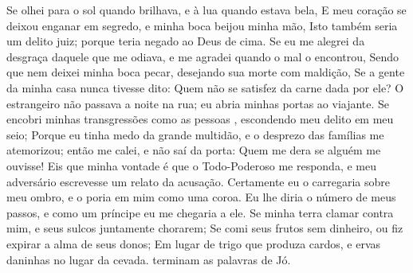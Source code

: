 {Se olhei para o sol quando brilhava, e à lua quando estava bela,
E meu coração se deixou enganar em segredo, e minha boca beijou minha mão,
Isto também seria um delito
{} juiz; porque teria negado ao Deus de cima.
Se eu me alegrei da desgraça daquele que me odiava, e me agradei quando o mal o encontrou,
Sendo que nem deixei minha boca pecar, desejando sua morte com maldição,
Se a gente da minha casa nunca tivesse dito: Quem não se satisfez da carne dada por ele?
O estrangeiro não passava a noite na rua; eu abria minhas portas ao viajante.
Se encobri minhas transgressões como as pessoas
{} ,
 escondendo meu delito em meu seio;
Porque eu tinha medo da grande multidão, e o desprezo das famílias me atemorizou; então me calei, e não saí da porta:
Quem me dera se alguém me ouvisse! Eis que minha vontade é que o Todo-Poderoso me responda, e meu adversário escrevesse um relato da acusação.
Certamente eu o carregaria sobre meu ombro, e o poria em mim como uma coroa.
Eu lhe diria o número de meus passos, e como um príncipe eu me chegaria a ele.
Se minha terra clamar contra mim, e seus sulcos juntamente chorarem;
Se comi seus frutos sem
{} dinheiro, ou fiz expirar a alma de seus donos;
Em lugar de trigo que
{} produza cardos, e ervas daninhas no lugar da cevada.
{} terminam as palavras de Jó.

}
